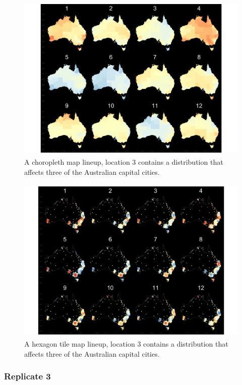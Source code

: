 \documentclass{monashthesis}
\begin{document}
\begin{figure}[H]
\centering
\includegraphics[height=8cm]{lineups/three-geo5-1.pdf}
\caption{\label{fig:three-geo5}A choropleth map lineup, location 3 contains a distribution that affects three of the Australian capital cities.}
\end{figure}

\begin{figure}[H]
\centering
\includegraphics[height=8cm]{lineups/three-hex5-1.pdf}
\caption{\label{fig:three-hex5}A hexagon tile map lineup, location 3 contains a distribution that affects three of the Australian capital cities.}
\end{figure}

\hypertarget{replicate-3-1}{%
\subsubsection{Replicate 3}\label{replicate-3-1}}
\end{document}
